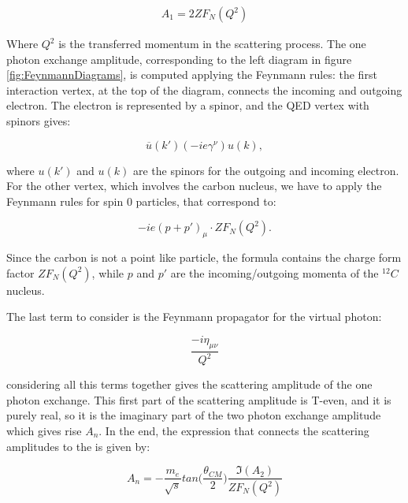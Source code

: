 \begin{align*}
A_{1} = 2Z F_{N}(Q^{2})
\end{align*} 

Where $Q^{2}$ is the transferred momentum in the scattering process. The one photon exchange amplitude, corresponding to the left diagram in figure \ref{fig:FeynmannDiagrams}, is computed applying the Feynmann rules: the first interaction vertex, at the top of the diagram, connects the incoming and outgoing electron. The electron is represented by a spinor, and the QED vertex with spinors gives: 

\begin{equation}
\overline{u}(k') (-ie \gamma^{\nu}) u(k) ,
\end{equation} 

where $u(k')$ and $u(k)$ are the spinors for the outgoing and incoming electron.
For the other vertex, which involves the carbon nucleus, we have to apply the Feynmann rules for spin 0 particles, that correspond to:

\begin{equation}
-ie(p + p')_{\mu} \cdot Z F_{N}(Q^{2}).
\end{equation}

Since the carbon is not a point like particle, the formula contains the charge form factor $Z F_{N}(Q^{2})$, while $p$ and $p'$ are the incoming/outgoing momenta of the $^{12}C$ nucleus. 

The last term to consider is the Feynmann propagator for the virtual photon:

\begin{equation}
\frac{-i \eta_{\mu \nu}}{Q^{2}}
\end{equation}

considering all this terms together gives the scattering amplitude of the one photon exchange. This first part of the scattering amplitude is T-even, and it is purely real, so it is the imaginary part of the two photon exchange amplitude which gives rise $A_{n}$. In the end, the expression that connects the scattering amplitudes to the \transv is given by:

\begin{equation} \label{eq:integral}
A_{n} = -\frac{m_{e}}{\sqrt{s}} tan \bigl (\frac{\theta_{CM}}{2} \bigl) \dfrac{\Im(A_{2})}{ZF_{N}(Q^{2})}
\end{equation}

